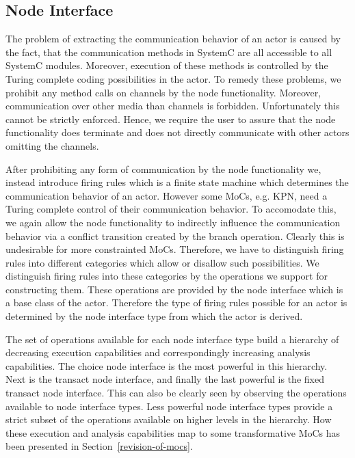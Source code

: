 \subsection{Node Interface}
The problem of extracting the communication behavior of an actor is caused
by the fact, that the communication methods in SystemC are all accessible
to all SystemC modules. Moreover, execution of these methods is controlled
by the Turing complete coding possibilities in the actor. To remedy these
problems, we prohibit any method calls on \SysteMoC{} channels
by the node functionality. Moreover,
communication over other media than \SysteMoC{} channels is forbidden.
Unfortunately this cannot be strictly enforced. Hence, we require the \SysteMoC{} user
to assure that the node functionality does terminate and does not
directly communicate with other actors omitting the \SysteMoC{} channels.

After prohibiting any form of communication by the node functionality we,
instead introduce firing rules which is a finite state machine which determines
the communication behavior of an actor. However some MoCs, e.g. KPN, need
a Turing complete control of their communication behavior. To
accomodate this, we again allow the node functionality to indirectly
influence the communication behavior via a conflict transition
created by the branch operation. Clearly this is undesirable for more
constrainted MoCs. Therefore, we have to distinguish firing rules into
different categories which allow or disallow such possibilities. We
distinguish firing rules into these categories by the operations we
support for constructing them. These operations are provided by the
node interface which is a base class of the actor. Therefore the
type of firing rules possible for an actor is determined by the
node interface type from which the actor is derived.


The set of operations available for each node interface type
build a hierarchy of decreasing execution capabilities and
correspondingly increasing analysis capabilities.
The choice node interface is the most powerful in this hierarchy.
Next is the transact node interface, and finally the last powerful is the
fixed transact node interface. This can also be clearly seen
by observing the operations available to node interface types.
Less powerful node interface types provide a strict subset of
the operations available on higher levels in the hierarchy.
How these execution and analysis capabilities map to some transformative
MoCs has been presented in Section~\ref{revision-of-mocs}.

